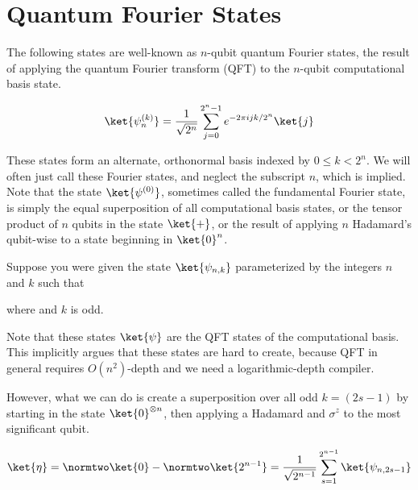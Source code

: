 \section{Quantum Fourier States}
\label{sec:qfs}

The following states are well-known as $n$-qubit quantum Fourier states,
the result of applying the quantum Fourier transform (QFT)
to the $n$-qubit computational basis state. 

\begin{equation}
\ket{\psi^{(k)}_{n}} = \frac{1}{\sqrt{2^n}} \sum_{j=0}^{2^n-1}
e^{-2\pi i j k / 2^n} \ket{j}
\end{equation}

These states form an alternate, orthonormal basis indexed by
$0 \le k < 2^n$. We will often just call these Fourier states,
and neglect the subscript $n$, which is implied.
Note that the state $\ket{\psi^{(0)}}$, sometimes
called the fundamental Fourier state, is simply the equal superposition
of all computational basis states, or the tensor product of
$n$ qubits in the state $\ket{+}$, or the result of applying
$n$ Hadamard's qubit-wise to a state beginning in $\ket{0}^n$.

Suppose you were given the state $\ket{\psi_{n,k}}$
parameterized by the
integers $n$ and $k$ such that


where  and $k$ is odd.

Note that these states $\ket{\psi}$ are the
QFT states of the computational basis.
This implicitly argues that these states are hard to create,
because QFT in general requires
$O(n^2)$-depth and we need a logarithmic-depth compiler.

However, what we can do is create a superposition over all odd $k=(2s-1)$
by starting in the state $\ket{0}^{\otimes n}$,
then applying a Hadamard and $\sigma^z$ to the most significant qubit.

\begin{equation}
\ket{\eta} = \normtwo \ket{0} - \normtwo \ket{2^{n-1}} =
\frac{1}{\sqrt{2^{n-1}}} \sum_{s=1}^{2^{n-1}} \ket{\psi_{n,2s-1}}
\end{equation}

